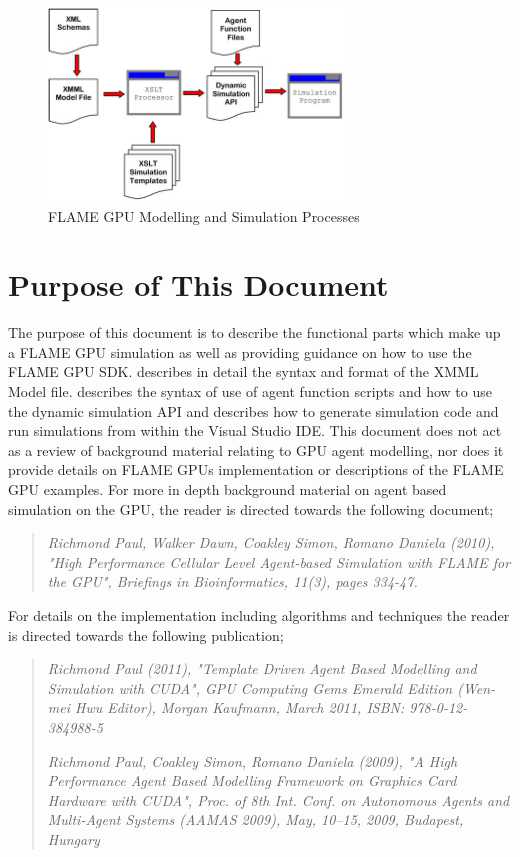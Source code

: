 \documentclass[11pt, a4paper, onecolumn, oneside]{report}
\begin{document}
\begin{figure}[ht]
    \centering
    \includegraphics[width=0.70\textwidth]{img/figure1}
    \caption{FLAME GPU Modelling and Simulation Processes}
    \label{fig:modelling-and-simulation-process}
\end{figure} 

\section{Purpose of This Document}
\label{sec:12}

The purpose of this document is to describe the functional parts which make up a FLAME GPU simulation as well as providing guidance on how to use the FLAME GPU SDK.
 describes in detail the syntax and format of the XMML Model file.
 describes the syntax of use of agent function scripts and how to use the dynamic simulation API and  describes how to generate simulation code and run simulations from within the Visual Studio IDE.
This document does not act as a review of background material relating to GPU agent modelling, nor does it provide details on FLAME GPUs implementation or descriptions of the FLAME GPU examples.
For more in depth background material on agent based simulation on the GPU, the reader is directed towards the following document;

\begin{quote}
\emph{Richmond Paul, Walker Dawn, Coakley Simon, Romano Daniela (2010), "High Performance Cellular Level Agent-based Simulation with FLAME for the GPU", Briefings in Bioinformatics, 11(3), pages 334-47.}
\end{quote}

For details on the implementation including algorithms and techniques the reader is directed towards the following publication;

\begin{quote}
\emph{Richmond Paul (2011), "Template Driven Agent Based Modelling and Simulation with CUDA", GPU Computing Gems Emerald Edition (Wen-mei Hwu Editor), Morgan Kaufmann, March 2011, ISBN: 978-0-12-384988-5}

\emph{Richmond Paul, Coakley Simon, Romano Daniela (2009), "A High Performance Agent Based Modelling Framework on Graphics Card Hardware with CUDA", Proc. of 8th Int. Conf. on Autonomous Agents and Multi-Agent Systems (AAMAS 2009), May, 10--15, 2009, Budapest, Hungary}
\end{quote}
\end{document}
